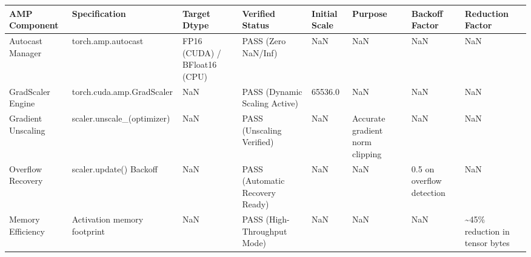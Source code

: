 \begin{tabular}{llllllll}
\toprule
AMP Component & Specification & Target Dtype & Verified Status & Initial Scale & Purpose & Backoff Factor & Reduction Factor \\
\midrule
Autocast Manager & torch.amp.autocast & FP16 (CUDA) / BFloat16 (CPU) & PASS (Zero NaN/Inf) & NaN & NaN & NaN & NaN \\
GradScaler Engine & torch.cuda.amp.GradScaler & NaN & PASS (Dynamic Scaling Active) & 65536.0 & NaN & NaN & NaN \\
Gradient Unscaling & scaler.unscale\_(optimizer) & NaN & PASS (Unscaling Verified) & NaN & Accurate gradient norm clipping & NaN & NaN \\
Overflow Recovery & scaler.update() Backoff & NaN & PASS (Automatic Recovery Ready) & NaN & NaN & 0.5 on overflow detection & NaN \\
Memory Efficiency & Activation memory footprint & NaN & PASS (High-Throughput Mode) & NaN & NaN & NaN & \textasciitilde 45\% reduction in tensor bytes \\
\bottomrule
\end{tabular}
